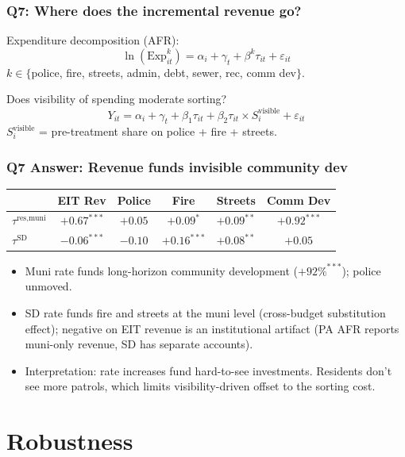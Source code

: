 \documentclass[xcolor = x11names, compress, aspectratio = 169]{beamer}
\renewcommand{\(}{\begin{columns}}
\renewcommand{\)}{\end{columns}}
\newcommand{\<}[1]{\begin{column}{#1}}
\renewcommand{\>}{\end{column}}
\begin{document}
\begin{frame}
\frametitle{Q7: Where does the incremental revenue go?}
    \small
    Expenditure decomposition (AFR):
    \[
    \ln(\text{Exp}^{k}_{it}) = \alpha_i + \gamma_t + \beta^{k} \tau_{it} + \varepsilon_{it}
    \]
    $k \in \{$police, fire, streets, admin, debt, sewer, rec, comm dev$\}$.
    \vspace{0.1cm}

    Does visibility of spending moderate sorting?
    \[
    Y_{it} = \alpha_i + \gamma_t + \beta_1 \tau_{it} + \beta_2 \tau_{it} \times S^{\text{visible}}_i + \varepsilon_{it}
    \]
    $S^{\text{visible}}_i$ = pre-treatment share on police + fire + streets.
\end{frame}

\begin{frame}
\frametitle{Q7 Answer: Revenue funds invisible community dev}
    \centering
    \small
    \begin{tabular}{lccccc}
        \toprule
        & EIT Rev & Police & Fire & Streets & Comm Dev \\
        \midrule
        $\tau^{\text{res,muni}}$ & $+0.67^{***}$ & $+0.05$ & $+0.09^{*}$ & $+0.09^{**}$ & $+0.92^{***}$ \\
        $\tau^{\text{SD}}$       & $-0.06^{***}$ & $-0.10$ & $+0.16^{***}$ & $+0.08^{**}$ & $+0.05$ \\
        \bottomrule
    \end{tabular}
    \vspace{0.2cm}
    \begin{itemize}\setlength{\itemsep}{0.05cm}\small
        \item Muni rate funds long-horizon community development
        ($+92\%^{***}$); police unmoved.
        \item SD rate funds fire and streets at the muni level (cross-budget
        substitution effect); negative on EIT revenue is an institutional
        artifact (PA AFR reports muni-only revenue, SD has separate accounts).
        \item Interpretation: rate increases fund hard-to-see investments.
        Residents don't see more patrols, which limits visibility-driven
        offset to the sorting cost.
    \end{itemize}
\end{frame}
\fi %

\section{Robustness}
\end{document}
